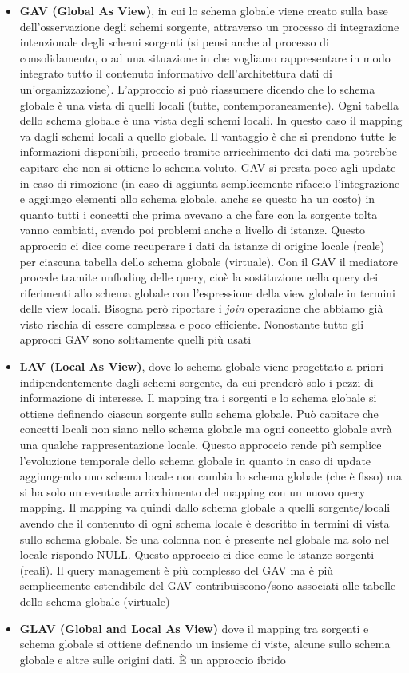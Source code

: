 \documentclass[a4paper,12pt, oneside]{book}
\begin{document}
\begin{itemize}
  \item \textbf{GAV (Global As View)}, in cui lo schema globale viene creato
  sulla base dell'osservazione degli schemi sorgente, attraverso un
  processo di integrazione intenzionale degli schemi sorgenti (si pensi
  anche al processo di consolidamento, o ad una situazione in che vogliamo
  rappresentare in modo integrato tutto il contenuto informativo
  dell'architettura dati di un'organizzazione). L'approccio si può
  riassumere dicendo che lo schema globale è una vista di quelli locali (tutte,
  contemporaneamente). Ogni tabella dello schema globale è una vista degli
  schemi locali. In questo caso il mapping va dagli schemi locali a quello
  globale. Il vantaggio è che si prendono tutte le informazioni disponibili,
  procedo tramite arricchimento dei dati ma potrebbe capitare che non si ottiene
  lo schema voluto. GAV si presta poco agli update in caso di rimozione (in caso
  di aggiunta semplicemente rifaccio l'integrazione e aggiungo elementi allo
  schema globale, anche se questo ha un costo) in quanto tutti i concetti che
  prima avevano a che fare con la 
  sorgente tolta vanno cambiati, avendo poi problemi anche a livello di istanze.
  Questo approccio ci dice come recuperare i dati da istanze di origine locale
  (reale) per ciascuna tabella dello schema globale (virtuale). Con il GAV il
  mediatore procede tramite unfloding delle query, cioè la sostituzione nella
  query dei riferimenti allo schema globale con l'espressione della
  view globale in termini delle view locali. Bisogna però riportare i
  \textit{join} operazione che abbiamo già visto rischia di essere complessa
  e poco efficiente. Nonostante tutto gli approcci GAV sono solitamente quelli
  più usati
 
  \item \textbf{LAV (Local As View)}, dove lo schema globale viene progettato a
  priori indipendentemente dagli schemi sorgente, da cui prenderò solo i pezzi
  di informazione di interesse. Il mapping tra i sorgenti e lo schema globale si
  ottiene definendo ciascun sorgente sullo schema globale. Può capitare che
  concetti locali non siano nello schema globale ma ogni concetto globale avrà
  una qualche rappresentazione locale. Questo approccio rende più semplice
  l'evoluzione temporale dello schema globale in quanto in caso di update
  aggiungendo uno schema locale non cambia lo schema globale (che è fisso) ma si
  ha solo un eventuale arricchimento del mapping con un nuovo query mapping. Il
  mapping va quindi dallo schema globale a quelli sorgente/locali avendo che il
  contenuto di ogni schema locale è descritto in termini di vista sullo schema
  globale. Se una colonna non è presente nel globale ma solo nel locale rispondo
  NULL. Questo approccio ci dice come le istanze sorgenti (reali). Il query
  management è più complesso del GAV ma è più semplicemente estendibile del GAV
  contribuiscono/sono associati alle tabelle dello schema globale (virtuale) 
  \item \textbf{GLAV (Global and Local As View)} dove il mapping tra sorgenti e
  schema globale si ottiene definendo un insieme di viste, alcune sullo schema
  globale e altre sulle origini dati. È un approccio ibrido
\end{itemize}
\end{document}

